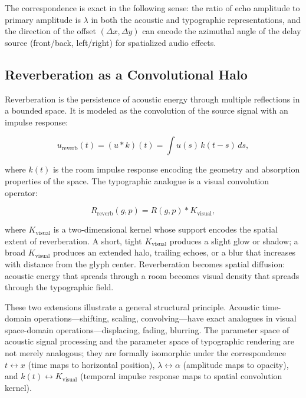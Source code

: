 \documentclass[12pt, a4paper]{article}
\begin{document}
The correspondence is exact in the following sense: the ratio of echo amplitude to primary amplitude is $\lambda$ in both the acoustic and typographic representations, and the direction of the offset $(\Delta x, \Delta y)$ can encode the azimuthal angle of the delay source (front/back, left/right) for spatialized audio effects.

\subsection{Reverberation as a Convolutional Halo}

Reverberation is the persistence of acoustic energy through multiple reflections in a bounded space. It is modeled as the convolution of the source signal with an impulse response:

\begin{equation}
u_{\mathrm{reverb}}(t) = (u * k)(t) = \int u(s)\, k(t - s)\, ds,
\label{eq:reverb}
\end{equation}

where $k(t)$ is the room impulse response encoding the geometry and absorption properties of the space. The typographic analogue is a visual convolution operator:

\begin{equation}
R_{\mathrm{reverb}}(g, p) = R(g, p) * K_{\mathrm{visual}},
\label{eq:Rreverb}
\end{equation}

where $K_{\mathrm{visual}}$ is a two-dimensional kernel whose support encodes the spatial extent of reverberation. A short, tight $K_{\mathrm{visual}}$ produces a slight glow or shadow; a broad $K_{\mathrm{visual}}$ produces an extended halo, trailing echoes, or a blur that increases with distance from the glyph center. Reverberation becomes spatial diffusion: acoustic energy that spreads through a room becomes visual density that spreads through the typographic field.

These two extensions illustrate a general structural principle. Acoustic time-domain operations---shifting, scaling, convolving---have exact analogues in visual space-domain operations---displacing, fading, blurring. The parameter space of acoustic signal processing and the parameter space of typographic rendering are not merely analogous; they are formally isomorphic under the correspondence $t \leftrightarrow x$ (time maps to horizontal position), $\lambda \leftrightarrow \alpha$ (amplitude maps to opacity), and $k(t) \leftrightarrow K_{\mathrm{visual}}$ (temporal impulse response maps to spatial convolution kernel).
\end{document}
